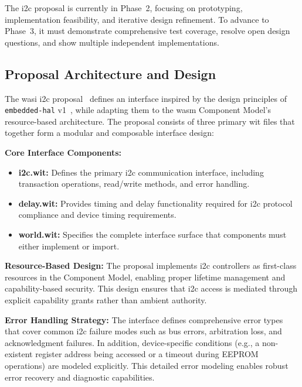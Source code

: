 The \acrshort{i2c} proposal is currently in Phase~2, focusing on prototyping, implementation feasibility, and iterative design refinement. To advance to Phase~3, it must demonstrate comprehensive test coverage, resolve open design questions, and show multiple independent implementations.

\subsection{Proposal Architecture and Design}
\label{subsec:i2c-proposal-design}

The \acrshort{wasi} \acrshort{i2c} proposal~\cite{wasi_i2c_proposal} defines an interface inspired by the design principles of \texttt{embedded-hal} v1~\cite{hal}, while adapting them to the \acrshort{wasm} Component Model's resource-based architecture. The proposal consists of three primary \acrshort{wit} files that together form a modular and composable interface design:

\textbf{Core Interface Components:}
\begin{itemize}
    \item \textbf{i2c.wit:} Defines the primary \acrshort{i2c} communication interface, including transaction operations, read/write methods, and error handling.
    \item \textbf{delay.wit:} Provides timing and delay functionality required for \acrshort{i2c} protocol compliance and device timing requirements.
    \item \textbf{world.wit:} Specifies the complete interface surface that components must either implement or import.
\end{itemize}

\textbf{Resource-Based Design:} The proposal implements \acrshort{i2c} controllers as first-class resources in the Component Model, enabling proper lifetime management and capability-based security. This design ensures that \acrshort{i2c} access is mediated through explicit capability grants rather than ambient authority.

\textbf{Error Handling Strategy:} The interface defines comprehensive error types that cover common \acrshort{i2c} failure modes such as bus errors, arbitration loss, and acknowledgment failures. In addition, device-specific conditions (e.g., a non-existent register address being accessed or a timeout during EEPROM operations) are modeled explicitly. This detailed error modeling enables robust error recovery and diagnostic capabilities.

